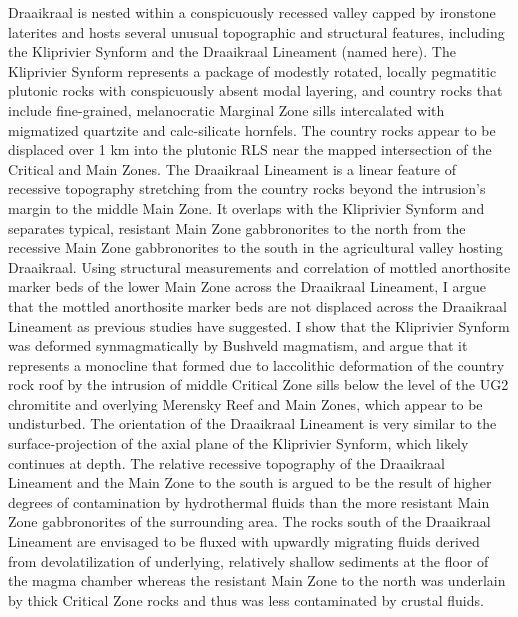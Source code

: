 Draaikraal is nested within a conspicuously recessed valley capped by ironstone laterites 
and hosts several unusual topographic and structural features, 
including the Kliprivier Synform and the Draaikraal Lineament (named here).
The Kliprivier Synform represents a package of modestly rotated, locally pegmatitic
plutonic rocks with conspicuously absent modal layering, and country rocks that
include fine-grained, melanocratic Marginal Zone sills intercalated with migmatized quartzite and calc-silicate hornfels. 
The country rocks appear to be displaced over 1 km into the plutonic RLS near the mapped intersection of the Critical
and Main Zones. The Draaikraal Lineament is a linear
feature of recessive topography stretching from the country rocks beyond
the intrusion's margin to the middle Main Zone. It overlaps with the
Kliprivier Synform and separates typical, resistant Main Zone
gabbronorites to the north from the recessive Main Zone gabbronorites to
the south in the agricultural valley hosting Draaikraal. Using structural
measurements and correlation of mottled anorthosite marker beds of the
lower Main Zone across the Draaikraal Lineament, I argue that the mottled anorthosite marker beds are
not displaced across the Draaikraal Lineament as previous studies have suggested. I show that the Kliprivier
Synform was deformed synmagmatically by Bushveld magmatism, and argue that it represents a monocline that formed due to laccolithic
deformation of the country rock roof by the intrusion of middle Critical Zone
sills below the level of the UG2 chromitite and overlying Merensky
Reef and Main Zones, which appear to be undisturbed. The orientation of the Draaikraal Lineament is very
similar to the surface-projection of the axial plane of the Kliprivier
Synform, which likely continues at depth. The relative recessive
topography of the Draaikraal Lineament and the Main Zone to the south is
argued to be the result of higher degrees of contamination by
hydrothermal fluids than the more resistant Main Zone gabbronorites of
the surrounding area. The rocks south of the Draaikraal Lineament are
envisaged to be fluxed with upwardly migrating fluids derived from devolatilization 
of underlying, relatively shallow sediments at the floor of the magma chamber whereas
the resistant Main Zone to the north was underlain by thick Critical Zone rocks and thus 
was less contaminated by crustal fluids.

